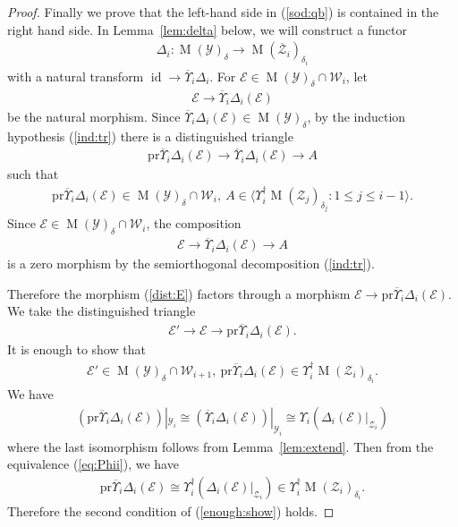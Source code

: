 \documentclass [11pt,oneside,a4paper,mathscr]{amsart}
\theoremstyle{definition}
\renewcommand{\leq}{\leqslant}
\newcommand{\E}{\mathcal{E}}
\newcommand{\Y}{\mathcal{Y}}
\newcommand{\zZ}{\mathcal{Z}}
\newcommand{\MM}{\operatorname{M}}
\newcommand{\id}{\operatorname{id}}
\newcommand{\ol}{\overline}
\begin{document}
\begin{proof}
Finally we prove that the left-hand side in (\ref{sod:qb}) is contained in the right 
hand side. In Lemma~\ref{lem:delta} below, we will construct a functor
\begin{align*}\Delta_i\colon \MM(\mathcal{Y})_{\delta}\to 
\MM(\overline{\mathcal{Z}}_i)_{\delta_i}
\end{align*}
with a natural transform $\id \to \overline{\Upsilon}_i \Delta_i$. 
For $\E \in \MM(\Y)_{\delta} \cap \mathcal{W}_i$, let 
\begin{align}\label{dist:E}
\E \to \ol{\Upsilon}_i \Delta_i(\E)
\end{align}
be the natural morphism. 
Since $\ol{\Upsilon}_i \Delta_i(\E) \in \MM(\Y)_{\delta}$, 
by the induction hypothesis (\ref{ind:tr})
there is a distinguished triangle 
\begin{align*}
    \mathrm{pr}\ol{\Upsilon}_i\Delta_i(\E) \to \ol{\Upsilon}_i \Delta_i(\E) \to A
\end{align*}
such that 
\begin{align*}
    \mathrm{pr}\ol{\Upsilon}_i\Delta_i(\E) \in \MM(\Y)_{\delta} \cap \mathcal{W}_i, \ 
    A \in \langle \Upsilon_i^{\dag}\MM(\zZ_j)_{\delta_j} : 1\leq j\leq i-1  \rangle. 
\end{align*}
Since $\mathcal{E} \in \MM(\mathcal{Y})_{\delta} \cap \mathcal{W}_i$, 
the 
composition 
\begin{align*}
    \E \to  \ol{\Upsilon}_i \Delta_i(\E) \to A
    \end{align*}
is a zero morphism by the semiorthogonal decomposition (\ref{ind:tr}). 

Therefore the morphism (\ref{dist:E}) factors through 
a morphism $\E \to \mathrm{pr}\ol{\Upsilon}_i \Delta_i(\E)$. 
We take the distinguished triangle 
\begin{align}\label{tr:E'}
    \E' \to \E \to \mathrm{pr}\ol{\Upsilon}_i \Delta_i(\E). 
\end{align}
It is enough to show that 
\begin{align}\label{enough:show}
\E' \in \MM(\Y)_{\delta} \cap \mathcal{W}_{i+1}, \ \mathrm{pr}\ol{\Upsilon}_i \Delta_i(\E)
\in \Upsilon_i^{\dag}\MM(\zZ_i)_{\delta_i}. 
\end{align}
We have 
\begin{align}\label{isom:Upsilon}
(\mathrm{pr}\ol{\Upsilon}_i \Delta_i(\E))|_{\Y_i} \cong 
(\ol{\Upsilon}_i \Delta_i(\E))|_{\Y_i} \cong \Upsilon_i(\Delta_i(\E)|_{\zZ_i})
\end{align}
where the last isomorphism follows from Lemma~\ref{lem:extend}. 
Then from the equivalence (\ref{eq:Phii}), we have 
\begin{align*}
   \mathrm{pr}\ol{\Upsilon}_i \Delta_i(\E)\cong\Upsilon_i^{\dag}(\Delta_i(\E)|_{\zZ_i})
\in \Upsilon_i^{\dag}\MM(\zZ_i)_{\delta_i}.
\end{align*}
Therefore the second condition of (\ref{enough:show}) holds. 


\end{proof}
\end{document}

